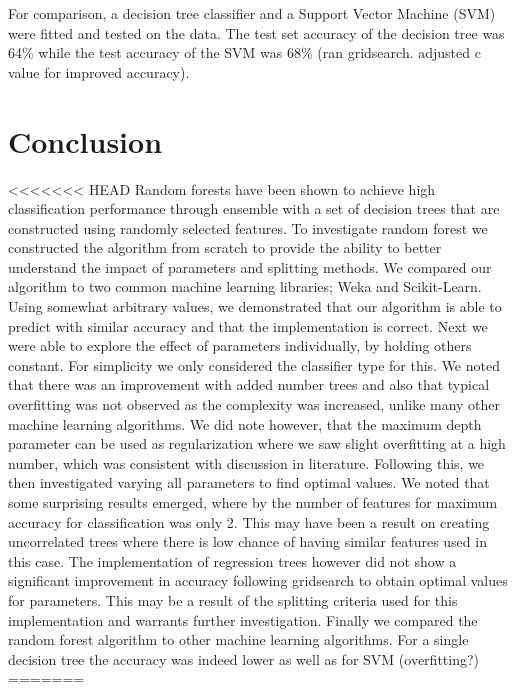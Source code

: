 \documentclass{article} %
\begin{document}
For comparison, a decision tree classifier and a Support Vector Machine (SVM) were fitted and tested on the data. The test set accuracy of the decision tree was 64\% while the test accuracy of the SVM was 68\% (ran gridsearch. adjusted c value for improved accuracy).

\section{Conclusion}

<<<<<<< HEAD
Random forests have been shown to achieve high classification performance through ensemble with a set of decision trees that are constructed using randomly selected features. To investigate random forest we constructed the algorithm from scratch to provide the ability to better understand the impact of parameters and splitting methods. We compared our algorithm to two common machine learning libraries; Weka and Scikit-Learn. Using somewhat arbitrary values, we demonstrated that our algorithm is able to predict with similar accuracy and that the implementation is correct. Next we were able to explore the effect of parameters individually, by holding others constant. For simplicity we only considered the classifier type for this. We noted that there was an improvement with added number trees and also that typical overfitting was not observed as the complexity was increased, unlike many other machine learning algorithms. We did note however, that the maximum depth parameter can be used as regularization where we saw slight overfitting at a high number, which was consistent with discussion in literature. Following this, we then investigated varying all parameters to find optimal values. We noted that some surprising results emerged, where by the number of features for maximum accuracy for classification was only 2. This may have been a result on creating uncorrelated trees where there is low chance of having similar features used in this case. The implementation of regression trees however did not show a significant improvement in accuracy following gridsearch to obtain optimal values for parameters. This may be a result of the splitting criteria used for this implementation and warrants further investigation. Finally we compared the random forest algorithm to other machine learning algorithms. For a single decision tree the accuracy was indeed lower as well as for SVM (overfitting?)
=======
\end{document}
